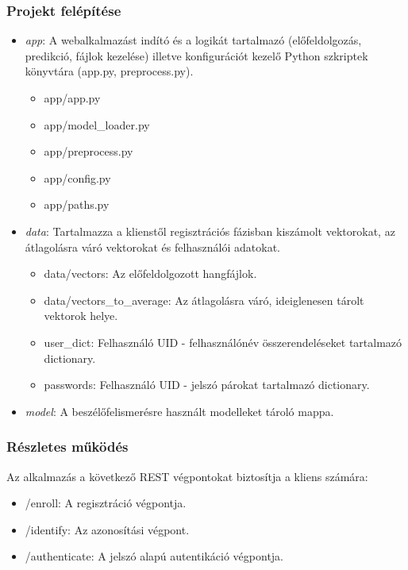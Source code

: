 \subsubsection{Projekt felépítése}

\begin{itemize}
	\item \emph{app}: A webalkalmazást indító és a logikát tartalmazó (előfeldolgozás, predikció, fájlok kezelése) illetve konfigurációt kezelő Python szkriptek könyvtára (app.py, preprocess.py).
	
	\begin{itemize}
		\item app/app.py
		\item app/model\_loader.py
		\item app/preprocess.py
		\item app/config.py
		\item app/paths.py
	\end{itemize}
	
	\item \emph{data}: Tartalmazza a klienstől regisztrációs fázisban kiszámolt vektorokat, az átlagolásra váró vektorokat és felhasználói adatokat.
	
	\begin{itemize}
		\item data/vectors: Az előfeldolgozott hangfájlok.
		\item data/vectors\_to\_average: Az átlagolásra váró, ideiglenesen tárolt vektorok helye.
		\item user\_dict: Felhasználó UID - felhasználónév összerendeléseket tartalmazó dictionary.
		\item passwords: Felhasználó UID - jelszó párokat tartalmazó dictionary.
	\end{itemize}
	
	\item \emph{model}: A beszélőfelismerésre használt modelleket tároló mappa.
\end{itemize}

\subsubsection{Részletes működés}

Az alkalmazás a következő REST végpontokat biztosítja a kliens számára:

\begin{itemize}
	\item /enroll: A regisztráció végpontja.
	\item /identify: Az azonosítási végpont.
	\item /authenticate: A jelszó alapú autentikáció végpontja.
\end{itemize}


